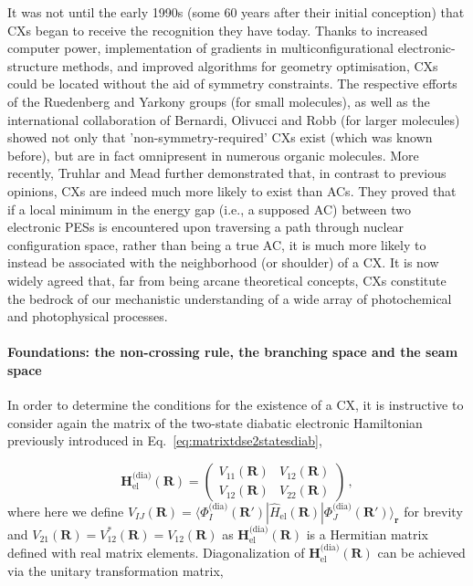 \documentclass[9pt,bestpractices,pubversion]{livecoms}
\newcommand{\R}{\mathbf{R}}
\newcommand{\Rprime}{\mathbf{R'}}
\newcommand{\re}{\mathbf{r}}
\begin{document}
It was not until the early 1990s (some 60 years after their initial conception) that CXs began to receive the recognition they have today.\cite{domcke_front_2004}
Thanks to increased computer power, implementation of gradients in multiconfigurational electronic-structure methods, and improved algorithms for geometry optimisation, CXs could be located without the aid of symmetry constraints.\cite{lipkowitz_conical_2007}
The respective efforts of the Ruedenberg\cite{atchity_potential_1991, xantheas_potential_1991} and Yarkony\cite{riad_manaa_noncrossing_1990} groups (for small molecules), as well as the international collaboration of Bernardi, Olivucci and Robb\cite{bernardi_mechanism_1990, bernardi_predicting_1990} (for larger molecules) showed not only that 'non-symmetry-required' CXs exist (which was known before), but are in fact omnipresent in numerous organic molecules.\cite{domcke_role_2012} 
More recently, Truhlar and Mead\cite{truhlar_relative_2003} further demonstrated that, in contrast to previous opinions, CXs are indeed much more likely to exist than ACs. 
They proved that if a local minimum in the energy gap (i.e., a supposed AC) between two electronic PESs is encountered upon traversing a path through nuclear configuration space, rather than being a true AC, it is much more likely to instead be associated with the neighborhood (or shoulder) of a CX. 
It is now widely agreed that, far from being arcane theoretical concepts,\cite{zhu_non-adiabaticity_2016,boeije_one-mode_2023} CXs constitute the bedrock of our mechanistic understanding of a wide array of photochemical and photophysical processes.\cite{gonzalez2012progress,domcke_role_2012,gozem2017theory,10.1039/9781782626954-00016,blancafort_photochemistry_2014,levine2019conical}

\paragraph{Foundations: the non-crossing rule, the branching space and the seam space}
\label{ch2_non-cross_branch_seam}

In order to determine the conditions for the existence of a CX, it is instructive to consider again the matrix of the two-state diabatic electronic Hamiltonian previously introduced in Eq.~\eqref{eq:matrixtdse2statesdiab},\cite{matsika_electronic_2021} 

\begin{equation}
\label{dia_elec_ham}  
    \mathbf{H}_{\text{el}}^{\text{(dia)}}(\R) =
    \begin{pmatrix}
        V_{11}(\R) & V_{12}(\R) \\
        V_{12}(\R) & V_{22}(\R)
    \end{pmatrix} \, ,
\end{equation}
where here we define $V_{IJ}(\R) = \langle \Phi_I^{\text{(dia)}}(\Rprime) | \hat{H}_{\text{el}}(\R) | \Phi_J^{\text{(dia)}}(\Rprime) \rangle_{\re}$ for brevity and $V_{21}(\R) = V^*_{12}(\R) = V_{12}(\R)$ as $\mathbf{H}_{\text{el}}^{\text{(dia)}}(\R)$ is a Hermitian matrix defined with real matrix elements.
Diagonalization of $\mathbf{H}_{\text{el}}^{\text{(dia)}}(\R)$ can be achieved via the unitary transformation matrix,
\end{document}
